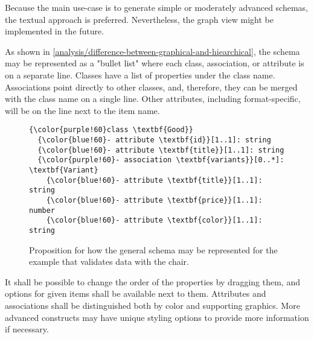 Because the main use-case is to generate simple or moderately advanced schemas, the textual approach is preferred. Nevertheless, the graph view might be implemented in the future.

\medskip

As shown in \autoref{analysis/difference-between-graphical-and-hiearchical}, the schema may be represented as a "bullet list" where each class, association, or attribute is on a separate line. Classes have a list of properties under the class name. Associations point directly to other classes, and, therefore, they can be merged with the class name on a single line. Other attributes, including format-specific, will be on the line next to the item name.

\begin{figure}[h!]\centering
  \begin{Verbatim}[commandchars=\\\{\}]
{\color{purple!60}class \textbf{Good}}
  {\color{blue!60}- attribute \textbf{id}}[1..1]: string
  {\color{blue!60}- attribute \textbf{title}}[1..1]: string
  {\color{purple!60}- association \textbf{variants}}[0..*]: \textbf{Variant}
    {\color{blue!60}- attribute \textbf{title}}[1..1]: string
    {\color{blue!60}- attribute \textbf{price}}[1..1]: number
    {\color{blue!60}- attribute \textbf{color}}[1..1]: string
\end{Verbatim}
  \caption{Proposition for how the general schema may be represented for the example that validates data with the chair.}
  \label{analysis/general-schema-representation}
\end{figure}

It shall be possible to change the order of the properties by dragging them, and options for given items shall be available next to them. Attributes and associations shall be distinguished both by color and supporting graphics. More advanced constructs may have unique styling options to provide more information if necessary.